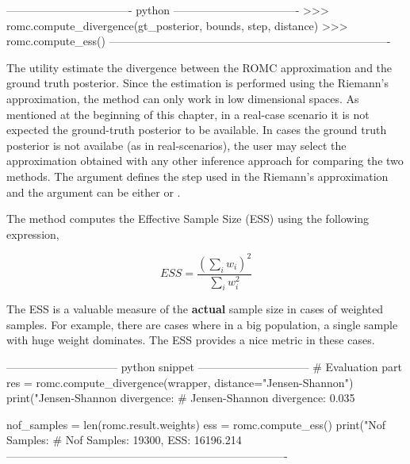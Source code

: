 \begin{Code}
---------------------------------- python ----------------------------------  
>>> romc.compute_divergence(gt_posterior, bounds, step, distance)
>>> romc.compute_ess()
----------------------------------------------------------------------------
\end{Code}

\noindent
The utility  estimate the divergence between
the ROMC approximation and the ground truth posterior. Since the
estimation is performed using the Riemann's approximation, the method
can only work in low dimensional spaces. As mentioned at the beginning
of this chapter, in a real-case scenario it is not expected the
ground-truth posterior to be available. In cases the ground truth
posterior is not availabe (as in real-scenarios), the user may select
the approximation obtained with any other inference approach for
comparing the two methods. The argument  defines the step
used in the Riemann's approximation and the argument 
can be either  or .

The method  computes the Effective Sample Size
(ESS) using the following expression,

\begin{equation} \label{eq:ESS}
  ESS = \frac{(\sum_i w_i)^2}{\sum_i w_i^2}
\end{equation}

The ESS is a valuable measure of the \textbf{actual} sample size in
cases of weighted samples. For example, there are cases where in a big
population, a single sample with huge weight dominates. The ESS
provides a nice metric in these cases.

\begin{Code}
------------------------------ python snippet ------------------------------  
  # Evaluation part
  res = romc.compute_divergence(wrapper, distance="Jensen-Shannon")                                 
  print("Jensen-Shannon divergence: %
  # Jensen-Shannon divergence: 0.035

  nof_samples = len(romc.result.weights)
  ess = romc.compute_ess()
  print("Nof Samples: %
  # Nof Samples: 19300, ESS: 16196.214
----------------------------------------------------------------------------  
\end{Code}
